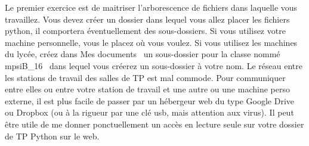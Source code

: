 Le premier exercice est de maitriser l'arborescence de fichiers dans laquelle vous travaillez. Vous devez créer un dossier dans lequel vous allez placer les fichiers python, il comportera éventuellement des sous-dossiers. \newline
Si vous utilisez votre machine personnelle, vous le placez où vous voulez. Si vous utilisez les machines du lycée, créez dans \og Mes documents\fg~ un sous-dossier pour la classe nommé \og mpsiB\_16\fg~ dans lequel vous créerez un sous-dossier à votre nom.\newline
Le réseau entre les stations de travail des salles de TP est mal commode. Pour communiquer entre elles ou entre votre station de travail et une autre ou une machine perso externe, il est plus facile de passer par un hébergeur web du type Google Drive ou Dropbox (ou à la rigueur par une clé usb, mais attention aux virus). Il peut être utile de me donner ponctuellement un accès en lecture seule sur votre dossier de TP Python sur le web.